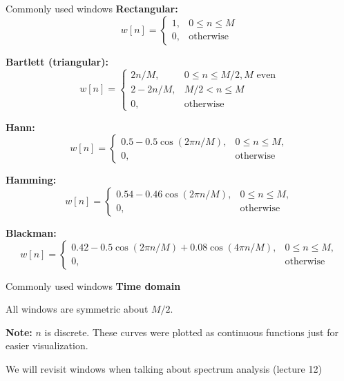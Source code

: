 \documentclass[10pt, handout]{beamer}
\begin{document}
%
\begin{frame}{Commonly used windows} \fontsize{10pt}{10}\selectfont
\textbf{Rectangular:}
\begin{equation*}
w[n] = \begin{cases}
1, &0 \leq n \leq M \\
0, &\text{otherwise}
\end{cases}
\end{equation*}

\textbf{Bartlett (triangular):}
\begin{equation*}
w[n] = \begin{cases}
2n/M, & 0 \leq n \leq M/2, M \text{ even}\\
2 - 2n/M, & M/2 < n \leq M \\
0, & \text{otherwise}
\end{cases}
\end{equation*}

\textbf{Hann:}
\begin{equation*}
w[n] = \begin{cases}
0.5 - 0.5\cos(2\pi n/M), & 0 \leq n \leq M, \\
0, &\text{otherwise}
\end{cases}
\end{equation*}

\textbf{Hamming:}
\begin{equation*}
w[n] = \begin{cases}
0.54 - 0.46\cos(2\pi n/M), & 0 \leq n \leq M, \\
0, &\text{otherwise}
\end{cases}
\end{equation*}

\textbf{Blackman:}
\begin{equation*}
w[n] = \begin{cases}
0.42 - 0.5\cos(2\pi n/M) + 0.08\cos(4\pi n/M), & 0 \leq n \leq M, \\
0, &\text{otherwise}
\end{cases}
\end{equation*}
\end{frame}

%
\begin{frame}{Commonly used windows}
\textbf{Time domain}

All windows are symmetric about $M/2$.

\begin{center}
\resizebox{0.9\textwidth}{!}{}
\end{center}
\textbf{Note:} $n$ is discrete. These curves were plotted as continuous functions just for easier visualization.

We will revisit windows when talking about spectrum analysis (lecture 12)
\end{frame}
\end{document}
